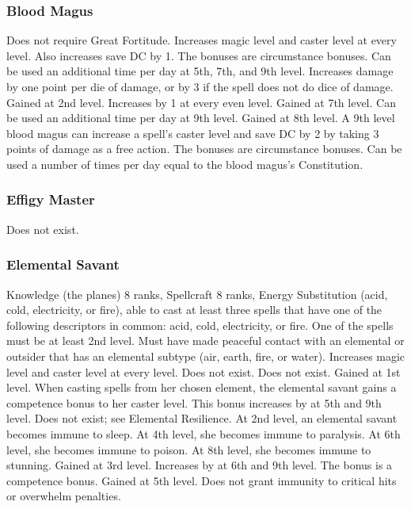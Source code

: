 \subsubsection{Blood Magus}
 Does not require Great Fortitude.
 Increases magic level and caster level at every level.
 Also increases save DC by 1. The bonuses are circumstance bonuses.
 Can be used an additional time per day at 5th, 7th, and 9th level.
 Increases damage by one point per die of damage, or by 3 if the spell does not do dice of damage.
 Gained at 2nd level. Increases by 1 at every even level.
 Gained at 7th level. Can be used an additional time per day at 9th level.
 Gained at 8th level.
 A 9th level blood magus can increase a spell's caster level and save DC by 2 by taking 3 points of damage as a free action. The bonuses are circumstance bonuses.
 Can be used a number of times per day equal to the blood magus's Constitution.
\subsubsection{Effigy Master}
Does not exist.
\subsubsection{Elemental Savant}
 Knowledge (the planes) 8 ranks, Spellcraft 8 ranks, Energy Substitution (acid, cold, electricity, or fire), able to cast at least three spells that have one of the following descriptors in common: acid, cold, electricity, or fire. One of the spells must be at least 2nd level. Must have made peaceful contact with an elemental or outsider that has an elemental subtype (air, earth, fire, or water).
 Increases magic level and caster level at every level.
 Does not exist.
 Does not exist.
 Gained at 1st level. When casting spells from her chosen element, the elemental savant gains a  competence bonus to her caster level. This bonus increases by  at 5th and 9th level.
 Does not exist; see Elemental Resilience.
 At 2nd level, an elemental savant becomes immune to sleep. At 4th level, she becomes immune to paralysis. At 6th level, she becomes immune to poison. At 8th level, she becomes immune to stunning.
 Gained at 3rd level. Increases by  at 6th and 9th level. The bonus is a competence bonus.
 Gained at 5th level.
 Does not grant immunity to critical hits or overwhelm penalties.
